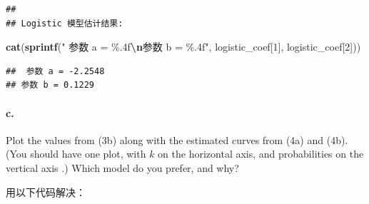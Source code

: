 \documentclass[
]{article}
\newenvironment{Shaded}{\begin{snugshade}}{\end{snugshade}}
\newcommand{\DecValTok}[1]{\textcolor[rgb]{0.00,0.00,0.81}{#1}}
\newcommand{\FunctionTok}[1]{\textcolor[rgb]{0.13,0.29,0.53}{\textbf{#1}}}
\newcommand{\NormalTok}[1]{#1}
\newcommand{\SpecialCharTok}[1]{\textcolor[rgb]{0.81,0.36,0.00}{\textbf{#1}}}
\newcommand{\StringTok}[1]{\textcolor[rgb]{0.31,0.60,0.02}{#1}}
\begin{document}
\begin{verbatim}
## 
## Logistic 模型估计结果:
\end{verbatim}

\begin{Shaded}
\begin{Highlighting}[]
\FunctionTok{cat}\NormalTok{(}\FunctionTok{sprintf}\NormalTok{(}\StringTok{" 参数 a = \%.4f}\SpecialCharTok{\textbackslash{}n}\StringTok{参数 b = \%.4f"}\NormalTok{, logistic\_coef[}\DecValTok{1}\NormalTok{], logistic\_coef[}\DecValTok{2}\NormalTok{]))}
\end{Highlighting}
\end{Shaded}

\begin{verbatim}
##  参数 a = -2.2548
## 参数 b = 0.1229
\end{verbatim}

\paragraph{c.~}\label{c.}

Plot the values from (3b) along with the estimated curves from (4a) and
(4b). (You should have one plot, with \(k\) on the horizontal axis, and
probabilities on the vertical axis .) Which model do you prefer, and
why?

用以下代码解决：
\end{document}
